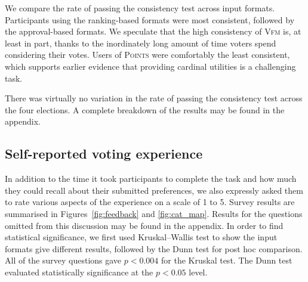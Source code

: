 \documentclass[runningheads]{llncs}
\newcommand{\kibitz}[2]{\ifnum\Comments=1{\color{#1}{#2}}\fi}
\newcommand{\rf}[1]{\kibitz{blue}{[Roy says:#1]}}
\newcommand{\gb}[1]{\kibitz{brown}{[GB:#1]}}
\newcommand{\points}{\textsc{Points}}
\newcommand{\vfm}{\textsc{Vfm}}
\begin{document}
We  compare the rate of passing the consistency test across input formats. 
Participants using the ranking-based formats were most consistent, followed by the approval-based formats.  We speculate that the high consistency of \vfm{} is, at least in part, thanks to the inordinately long amount of time voters spend considering their votes. Users of \points{} were comfortably the least consistent, which  supports earlier evidence that providing cardinal utilities is a challenging task.

There was virtually no variation in the rate of passing the consistency test across the four elections. A complete breakdown of the results may be found in the appendix. 



\subsection{Self-reported voting experience}
In addition to the time it took participants to complete the task and how much they could recall about their submitted preferences, we also expressly asked them to rate various aspects of the experience on a scale of 1 to 5. %
Survey results are summarised in  Figures~\ref{fig:feedback} and \ref{fig:cat_map}.
Results for the questions omitted from this discussion may be found in the appendix.
In order to find statistical significance, we first used Kruskal–Wallis test to show the input formats give different results, followed by the Dunn test for post hoc comparison.
All of the survey questions   gave $p < 0.004$  for the Kruskal test. The Dunn test evaluated statistically significance   at the $p < 0.05$ level.
\end{document}
